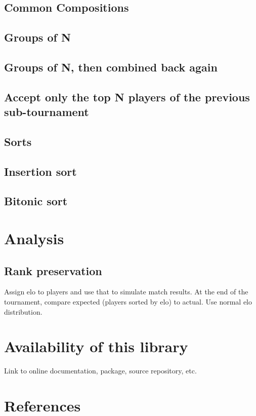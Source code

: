 \documentclass[a4,11pt,twoside,final]{article}
\begin{document}
\subsection{Common Compositions}
\label{sec:org84eae7e}
\subsection{Groups of N}
\label{sec:org49bcbee}
\subsection{Groups of N, then combined back again}
\label{sec:org786b8fc}
\subsection{Accept only the top N players of the previous sub-tournament}
\label{sec:org113f327}

\subsection{Sorts}
\label{sec:org8f3d473}
\subsection{Insertion sort}
\label{sec:org2a59525}
\subsection{Bitonic sort}
\label{sec:orgca55aef}

\section{Analysis}
\label{sec:org7ce2db4}
\subsection{Rank preservation}
\label{sec:orgcb05687}
Assign elo to players and use that to simulate match results. At the end of the
tournament, compare expected (players sorted by elo) to actual. Use normal elo
distribution.

\section{Availability of this library}
\label{sec:orgab7144c}
Link to online documentation, package, source repository, etc.

\section{References}
\label{sec:org6504dc5}
\end{document}
